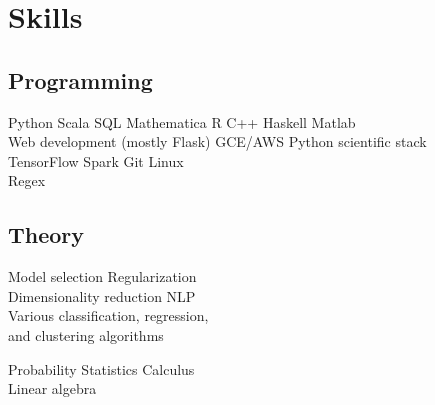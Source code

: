 \documentclass[]{deedy-resume-openfont}
\begin{document}
\begin{minipage}[t]{0.33\textwidth}


 \section{Skills}
 \subsection{Programming}
 Python \textbullet{} Scala \textbullet{} SQL \textbullet{} Mathematica
 R \textbullet{} C++ \textbullet{} Haskell \textbullet{} Matlab \\
 Web development (mostly Flask)
GCE/AWS \textbullet{} Python scientific stack \\
TensorFlow \textbullet{} Spark \textbullet{} Git \textbullet{} Linux \\
Regex
\sectionsep

\subsection{Theory}
Model selection \textbullet{} Regularization \\
Dimensionality reduction \textbullet{} NLP  \\
Various classification, regression, \\
and clustering algorithms

Probability \textbullet{} Statistics \textbullet{} Calculus \\
Linear algebra



%
%

\end{minipage} 
\end{document}
